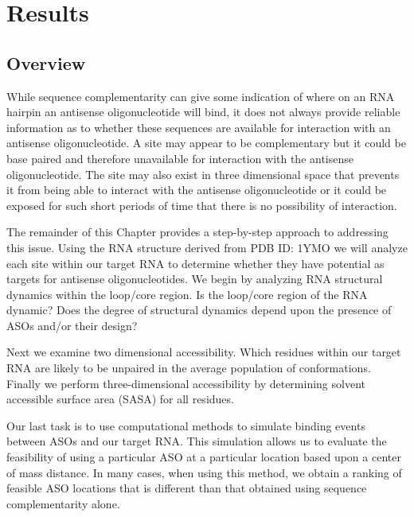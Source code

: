
\chapter{Results}
\label{chap:results}

\section{Overview}
\label{sec:results-overview}

While sequence complementarity can give some indication of where on an RNA 
hairpin an antisense oligonucleotide will bind, it does not always provide reliable information as 
to whether these sequences are available for interaction with an antisense oligonucleotide. A site 
may appear to be complementary but it could be base paired and therefore unavailable for interaction 
with the antisense oligonucleotide. The site may also exist in three dimensional space that prevents it 
from being able to interact with the antisense oligonucleotide or it could be exposed for such short 
periods of time that there is no possibility of interaction.

The remainder of this Chapter provides a step-by-step approach to addressing this issue. Using the 
RNA structure derived from PDB ID: 1YMO we will analyze each site within our target RNA to determine 
whether they have potential as targets for antisense oligonucleotides. We begin by analyzing RNA 
structural dynamics within the loop/core region. Is the loop/core region of the RNA dynamic? Does 
the degree of structural dynamics depend upon the presence of ASOs and/or their design?

Next we examine two dimensional accessibility. Which residues within our target RNA are likely to 
be unpaired in the average population of conformations. Finally we perform three-dimensional 
accessibility by determining solvent accessible surface area (SASA) for all residues.

Our last task is to use computational methods to simulate binding events between ASOs and our target 
RNA. This simulation allows us to evaluate the feasibility of using a particular ASO at a particular 
location based upon a center of mass distance. In many cases, when using this method, we obtain a 
ranking of feasible ASO locations that is different than that obtained using sequence complementarity 
alone.



